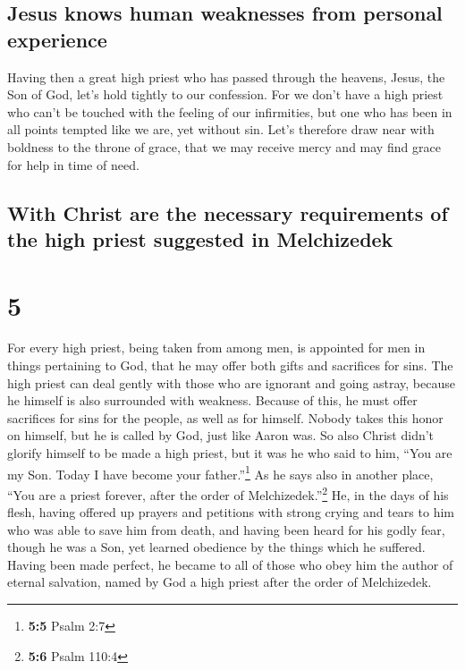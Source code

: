 \hypertarget{jesus-knows-human-weaknesses-from-personal-experience}{%
\subsection{Jesus knows human weaknesses from personal
experience}\label{jesus-knows-human-weaknesses-from-personal-experience}}

 Having then a great high priest who has passed through
the heavens, Jesus, the Son of God, let's hold tightly to our
confession.  For we don't have a high priest who can't be
touched with the feeling of our infirmities, but one who has been in all
points tempted like we are, yet without sin.  Let's
therefore draw near with boldness to the throne of grace, that we may
receive mercy and may find grace for help in time of need.

\hypertarget{with-christ-are-the-necessary-requirements-of-the-high-priest-suggested-in-melchizedek}{%
\subsection{With Christ are the necessary requirements of the high
priest suggested in
Melchizedek}\label{with-christ-are-the-necessary-requirements-of-the-high-priest-suggested-in-melchizedek}}

\hypertarget{section-4}{%
\section{5}\label{section-4}}

 For every high priest, being taken from among men, is
appointed for men in things pertaining to God, that he may offer both
gifts and sacrifices for sins.  The high priest can deal
gently with those who are ignorant and going astray, because he himself
is also surrounded with weakness.  Because of this, he
must offer sacrifices for sins for the people, as well as for himself.
 Nobody takes this honor on himself, but he is called by
God, just like Aaron was.  So also Christ didn't glorify
himself to be made a high priest, but it was he who said to him, ``You
are my Son. Today I have become your father.''\footnote{\textbf{5:5}
  Psalm 2:7}  As he says also in another place, ``You are
a priest forever, after the order of Melchizedek.''\footnote{\textbf{5:6}
  Psalm 110:4}  He, in the days of his flesh, having
offered up prayers and petitions with strong crying and tears to him who
was able to save him from death, and having been heard for his godly
fear,  though he was a Son, yet learned obedience by the
things which he suffered.  Having been made perfect, he
became to all of those who obey him the author of eternal salvation,
 named by God a high priest after the order of
Melchizedek.

